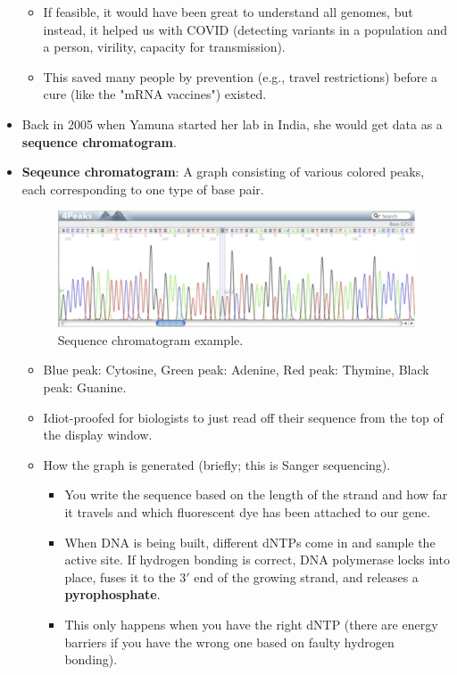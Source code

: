 \documentclass[../notes.tex]{subfiles}
\begin{document}
\begin{itemize}
\begin{itemize}
        \item If feasible, it would have been great to understand all genomes, but instead, it helped us with COVID (detecting variants in a population and a person, virility, capacity for transmission).
        \item This saved many people by prevention (e.g., travel restrictions) before a cure (like the "mRNA vaccines") existed.
    \end{itemize}
    \item Back in 2005 when Yamuna started her lab in India, she would get data as a \textbf{sequence chromatogram}.
    \item \textbf{Seqeunce chromatogram}: A graph consisting of various colored peaks, each corresponding to one type of base pair.
    \begin{figure}[h!]
        \centering
        \includegraphics[width=0.7\linewidth]{../ExtFiles/sequenceChromatogram.png}
        \caption{Sequence chromatogram example.}
        \label{fig:sequenceChromatogram}
    \end{figure}
    \begin{itemize}
        \item Blue peak: Cytosine, Green peak: Adenine, Red peak: Thymine, Black peak: Guanine.
        \item Idiot-proofed for biologists to just read off their sequence from the top of the display window.
        \item How the graph is generated (briefly; this is Sanger sequencing).
        \begin{itemize}
            \item You write the sequence based on the length of the strand and how far it travels and which fluorescent dye has been attached to our gene.
            \item When DNA is being built, different dNTPs come in and sample the active site. If hydrogen bonding is correct, DNA polymerase locks into place, fuses it to the $3'$ end of the growing strand, and releases a \textbf{pyrophosphate}.
            \item This only happens when you have the right dNTP (there are energy barriers if you have the wrong one based on faulty hydrogen bonding).

\end{itemize}
\end{itemize}
\end{itemize}
\end{document}
